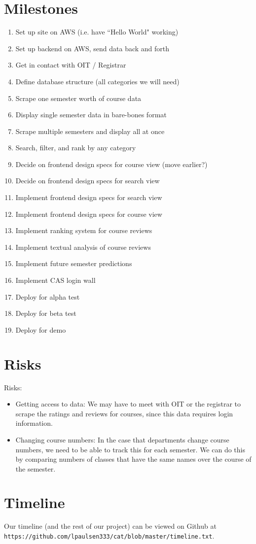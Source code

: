 \documentclass[11pt]{article}
\begin{document}
\section{Milestones}
\begin{enumerate}
\item Set up site on AWS (i.e. have ``Hello World" working)
\item Set up backend on AWS, send data back and forth
\item Get in contact with OIT / Registrar
\item Define database structure (all categories we will need)
\item Scrape one semester worth of course data
\item Display single semester data in bare-bones format
\item Scrape multiple semesters and display all at once
\item Search, filter, and rank by any category
\item Decide on frontend design specs for course view (move earlier?)
\item Decide on frontend design specs for search view
\par [No particular order from here on out]
\item Implement frontend design specs for search view
\item Implement frontend design specs for course view
\item Implement ranking system for course reviews
\item Implement textual analysis of course reviews
\item Implement future semester predictions
\item Implement CAS login wall
\item Deploy for alpha test
\item Deploy for beta test
\item Deploy for demo
\end{enumerate}

\section{Risks}
Risks:
\begin{itemize}
\item Getting access to data: We may have to meet with OIT or the registrar to scrape the ratings and reviews for courses, since this data requires login information.
\item Changing course numbers: In the case that departments change course numbers, we need to be able to track this for each semester. We can do this by comparing numbers of classes that have the same names over the course of the semester.
\end{itemize}

\section{Timeline}
Our timeline (and the rest of our project) can be viewed on Github at \\
\texttt{https://github.com/lpaulsen333/cat/blob/master/timeline.txt}.
\end{document}
